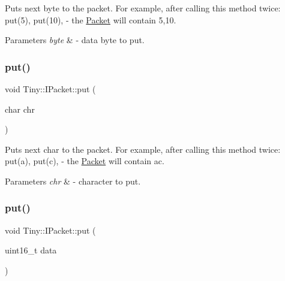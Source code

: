 Puts next byte to the packet. For example, after calling this method twice\+: put(5), put(10), -\/ the \hyperlink{classTiny_1_1Packet}{Packet} will contain 5,10. 
\begin{DoxyParams}{Parameters}
{\em byte} & -\/ data byte to put. \\
\hline
\end{DoxyParams}
\mbox{\label{classTiny_1_1IPacket_a9dd0344bbed4500af63a3f700d31945b}} 
\subsubsection{\texorpdfstring{put()}{put()}\hspace{0.1cm}{\footnotesize\ttfamily [2/7]}}
{\footnotesize\ttfamily void Tiny\+::\+I\+Packet\+::put (\begin{DoxyParamCaption}\item[{char}]{chr }\end{DoxyParamCaption})\hspace{0.3cm}{\ttfamily [inline]}}

Puts next char to the packet. For example, after calling this method twice\+: put(\textquotesingle{}a\textquotesingle{}), put(\textquotesingle{}c\textquotesingle{}), -\/ the \hyperlink{classTiny_1_1Packet}{Packet} will contain \textquotesingle{}ac\textquotesingle{}. 
\begin{DoxyParams}{Parameters}
{\em chr} & -\/ character to put. \\
\hline
\end{DoxyParams}
\mbox{\label{classTiny_1_1IPacket_a4dd6118251a5557691e4ed358a3b2ddc}} 
\subsubsection{\texorpdfstring{put()}{put()}\hspace{0.1cm}{\footnotesize\ttfamily [3/7]}}
{\footnotesize\ttfamily void Tiny\+::\+I\+Packet\+::put (\begin{DoxyParamCaption}\item[{uint16\+\_\+t}]{data }\end{DoxyParamCaption})\hspace{0.3cm}{\ttfamily [inline]}}

